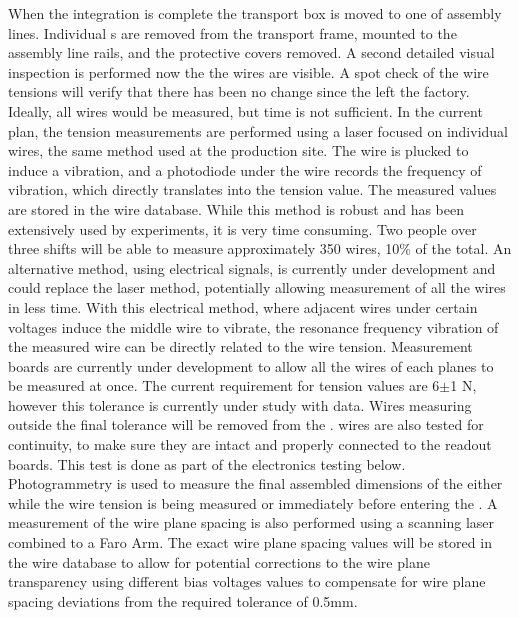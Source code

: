 When the  integration is complete the  transport box is moved to one of  assembly lines. Individual s are removed from the transport frame, mounted to the assembly line rails, and the protective covers removed. A second detailed visual inspection is performed now the the wires are visible. A spot check of the wire tensions will verify that there has been no change since the  left the factory.
Ideally, all wires would be measured, but time is not sufficient. 
In the current plan, the tension measurements are performed using a laser focused on individual wires, the same method used at the production site. 
The wire is plucked to induce a vibration, and a photodiode under the wire records the frequency of vibration, which directly translates into the tension value. 
The measured values are stored in the wire  database. 
While this method is robust and has been extensively used by  experiments, it is very time consuming. 
Two people over three shifts will be able to measure approximately 350 wires, 10\% of the total.  An alternative method, using electrical signals, is currently under development and could replace the laser method, potentially allowing measurement of all the wires in less time. With this electrical method, where adjacent wires under certain voltages induce the middle wire to vibrate, the resonance frequency vibration of the measured wire can be directly related to the wire tension. Measurement boards are currently under development to allow all the wires of each planes to be measured at once.
The current requirement for tension values are 6$\pm$1 N, however this tolerance is currently under study with  data.  
Wires measuring outside the final tolerance will be removed from the .
 wires are also tested for continuity, to make sure they are intact and properly connected to the readout boards.
This test is done as part of the  electronics testing below. 
Photogrammetry is used to measure the final assembled dimensions of the  either while the wire tension is being measured or immediately before entering the \coldbox. A measurement of the wire plane spacing is also performed using a scanning laser combined to a Faro Arm. The exact wire plane spacing values will be stored in the wire  database to allow for potential corrections to the wire plane transparency using different bias voltages values to compensate for wire plane spacing deviations from the required tolerance of 0.5mm.

